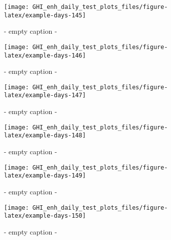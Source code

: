 \documentclass[
  10pt,
  a4paper,oneside]{article}
\begin{document}
\begin{figure}[H]

{\centering \texttt{[image: GHI\_enh\_daily\_test\_plots\_files/figure-latex/example-days-145]} 

}

\caption{ - empty caption - }\label{fig:example-days-145}
\end{figure}

\begin{figure}[H]

{\centering \texttt{[image: GHI\_enh\_daily\_test\_plots\_files/figure-latex/example-days-146]} 

}

\caption{ - empty caption - }\label{fig:example-days-146}
\end{figure}

\begin{figure}[H]

{\centering \texttt{[image: GHI\_enh\_daily\_test\_plots\_files/figure-latex/example-days-147]} 

}

\caption{ - empty caption - }\label{fig:example-days-147}
\end{figure}

\begin{figure}[H]

{\centering \texttt{[image: GHI\_enh\_daily\_test\_plots\_files/figure-latex/example-days-148]} 

}

\caption{ - empty caption - }\label{fig:example-days-148}
\end{figure}

\begin{figure}[H]

{\centering \texttt{[image: GHI\_enh\_daily\_test\_plots\_files/figure-latex/example-days-149]} 

}

\caption{ - empty caption - }\label{fig:example-days-149}
\end{figure}

\begin{figure}[H]

{\centering \texttt{[image: GHI\_enh\_daily\_test\_plots\_files/figure-latex/example-days-150]} 

}

\caption{ - empty caption - }\label{fig:example-days-150}
\end{figure}
\end{document}
